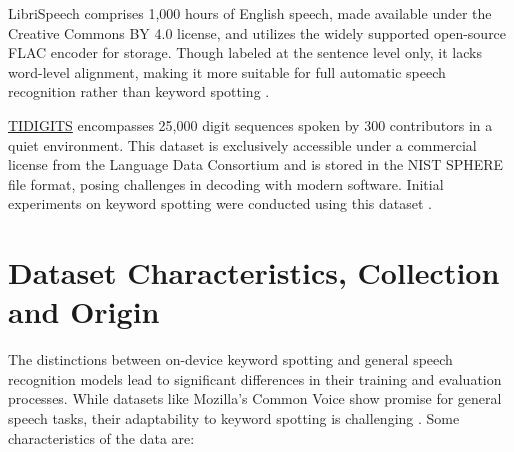 LibriSpeech \cite{Panayotov:2015} comprises 1,000 hours of English speech, made available under the Creative Commons BY 4.0 license, and utilizes the widely supported open-source FLAC encoder for storage. Though labeled at the sentence level only, it lacks word-level alignment, making it more suitable for full automatic speech recognition rather than keyword spotting \cite{Warden:2018}.

\href{https://catalog.ldc.upenn.edu/docs/LDC93S10/tidigits.readme.html}{TIDIGITS} encompasses 25,000 digit sequences spoken by 300 contributors in a quiet environment. This dataset is exclusively accessible under a commercial license from the Language Data Consortium and is stored in the NIST SPHERE file format, posing challenges in decoding with modern software. Initial experiments on keyword spotting were conducted using this dataset \cite{Warden:2018}.


\section{Dataset Characteristics, Collection and Origin}

The distinctions between on-device keyword spotting and general speech recognition models lead to significant differences in their training and evaluation processes. While datasets like Mozilla's Common Voice show promise for general speech tasks, their adaptability to keyword spotting is challenging \cite{Warden:2018}. Some characteristics of the data are:

